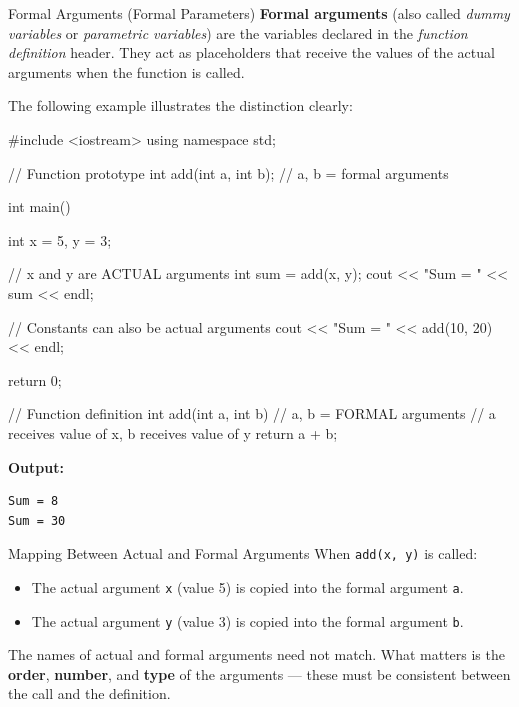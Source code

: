 \begin{definitionbox}{Formal Arguments (Formal Parameters)}
\textbf{Formal arguments} (also called \emph{dummy variables} or
\emph{parametric variables}) are the variables declared in the
\emph{function definition} header. They act as placeholders that receive the
values of the actual arguments when the function is called.
\end{definitionbox}

The following example illustrates the distinction clearly:

\begin{cppcode}
#include <iostream>
using namespace std;

// Function prototype
int add(int a, int b);  // a, b = formal arguments

int main()
{
    int x = 5, y = 3;

    // x and y are ACTUAL arguments
    int sum = add(x, y);
    cout << "Sum = " << sum << endl;

    // Constants can also be actual arguments
    cout << "Sum = " << add(10, 20) << endl;

    return 0;
}

// Function definition
int add(int a, int b)   // a, b = FORMAL arguments
{
    // a receives value of x, b receives value of y
    return a + b;
}
\end{cppcode}

\noindent\textbf{Output:}
\begin{verbatim}
Sum = 8
Sum = 30
\end{verbatim}

\begin{conceptbox}{Mapping Between Actual and Formal Arguments}
When \texttt{add(x, y)} is called:
\begin{itemize}
    \item The actual argument \texttt{x} (value 5) is copied into the formal
          argument \texttt{a}.
    \item The actual argument \texttt{y} (value 3) is copied into the formal
          argument \texttt{b}.
\end{itemize}
The names of actual and formal arguments need not match. What matters is the
\textbf{order}, \textbf{number}, and \textbf{type} of the arguments ---
these must be consistent between the call and the definition.
\end{conceptbox}


